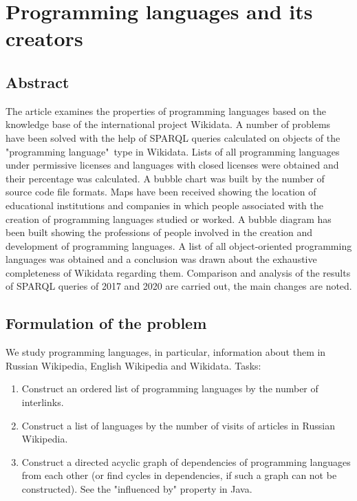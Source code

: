 \setchapterpreamble[u]{\margintoc}
\chapter{Programming languages and its creators\protect\footnotemark}


\section{Abstract}
The article examines the properties of programming languages based on the knowledge base of the international project Wikidata. A number of problems have been solved with the help of SPARQL queries calculated on objects of the "programming language"\  type in Wikidata. Lists of all programming languages under permissive licenses and languages with closed licenses were obtained and their percentage was calculated. A bubble chart was built by the number of source code file formats. Maps have been received showing the location of educational institutions and companies in which people associated with the creation of programming languages studied or worked. A bubble diagram has been built showing the professions of people involved in the creation and development of programming languages. A list of all object-oriented programming languages was obtained and a conclusion was drawn about the exhaustive completeness of Wikidata regarding them. Comparison and analysis of the results of SPARQL queries of 2017 and 2020 are carried out, the main changes are noted.

\section{Formulation of the problem}
We study programming languages, in particular, information about them in Russian Wikipedia, English Wikipedia and Wikidata.
Tasks:
\begin{enumerate}
\item Construct an ordered list of programming languages by the number of interlinks.
\item Construct a list of languages by the number of visits of articles in Russian Wikipedia.
\item Construct a directed acyclic graph of dependencies of programming languages from each other (or find cycles in dependencies, if such a graph can not be constructed). See the "influenced by" property in Java.
\end{enumerate}

